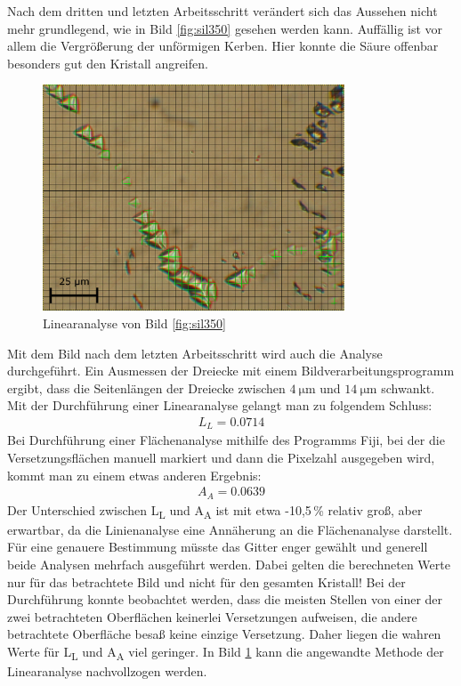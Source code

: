 \documentclass[german, %
parskip=full, %
bibliography=totoc, %
]{scrartcl}
\begin{document}
Nach dem dritten und letzten Arbeitsschritt verändert sich das Aussehen nicht mehr grundlegend, wie in Bild \ref{fig:sil350} gesehen werden kann. Auffällig ist vor allem die Vergrößerung der unförmigen Kerben. Hier konnte die Säure offenbar besonders gut den Kristall angreifen.

\begin{figure}[ht] 
  \centering
     \includegraphics[width=0.8\textwidth]{Silicium_3_50_mal2}
  \caption{Linearanalyse von Bild \ref{fig:sil350}}
  \label{fig:linana}
\end{figure}

Mit dem Bild nach dem letzten Arbeitsschritt wird auch die Analyse durchgeführt. Ein Ausmessen der Dreiecke mit einem Bildverarbeitungsprogramm ergibt, dass die Seitenlängen der Dreiecke zwischen \(\SI{4}{\micro\meter}\) und \(\SI{14}{\micro\meter}\) schwankt. Mit der Durchführung einer Linearanalyse gelangt man zu folgendem Schluss:
\begin{align*}
L_L = 0.0714
\end{align*}
Bei Durchführung einer Flächenanalyse mithilfe des Programms Fiji, bei der die Versetzungsflächen manuell markiert und dann die Pixelzahl ausgegeben wird, kommt man zu einem etwas anderen Ergebnis:
\begin{align*}
A_A = 0.0639
\end{align*}
Der Unterschied zwischen L\textsubscript{L} und A\textsubscript{A} ist mit etwa -10,5\,\% relativ groß, aber erwartbar, da die Linienanalyse eine Annäherung an die Flächenanalyse darstellt. Für eine genauere Bestimmung müsste das Gitter enger gewählt und generell beide Analysen mehrfach ausgeführt werden. Dabei gelten die berechneten Werte nur für das betrachtete Bild und nicht für den gesamten Kristall! Bei der Durchführung konnte beobachtet werden, dass die meisten Stellen von einer der zwei betrachteten Oberflächen keinerlei Versetzungen aufweisen, die andere betrachtete Oberfläche besaß keine einzige Versetzung. Daher liegen die wahren Werte für L\textsubscript{L} und A\textsubscript{A} viel geringer. In Bild \ref{fig:linana} kann die angewandte Methode der Linearanalyse nachvollzogen werden.
\end{document}
